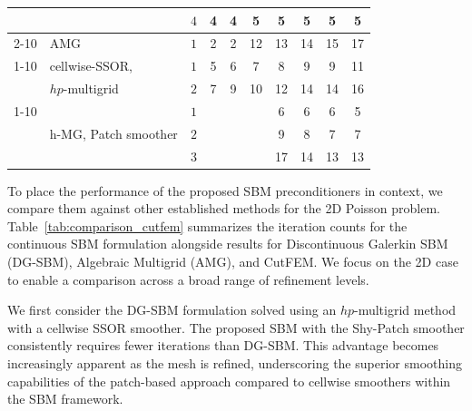 \documentclass{elsarticle}
\begin{document}
\begin{table}[h!]
\begin{tabular}{lll|ccccccc}
                                                &                                                              & $4$    & 4                                   & 4 & 5  & 5  & 5  & 5  & 5  \\
        \cline{2-10}
                                                & \multirow{1}{*}{AMG}                                         & $1$    & 2                                   & 2 & 12 & 13 & 14 & 15 & 17 \\
        \cline{1-10}
        \multirow{2}{*}{DG-SBM, $\lambda=0.25$} & {cellwise-SSOR,}                                             & $1$    & 5                                   & 6 & 7  & 8  & 9  & 9  & 11 \\
                                                & $hp$-multigrid                                               & $2$    & 7                                   & 9 & 10 & 12 & 14 & 14 & 16 \\
        \cline{1-10}
        \multirow{3}{*}{cutFEM}                 & \multirow{3}{*}{h-MG, Patch smoother\cite{cui2025multigrid}}

                                                & $1$                                                          &        &                                     &   & 6  & 6  & 6  & 5       \\
                                                &                                                              & $2$    &                                     &   &    & 9  & 8  & 7  & 7  \\
                                                &                                                              & $3$    &                                     &   &    & 17 & 14 & 13 & 13 \\
        \hline
    \end{tabular}
\end{table}

To place the performance of the proposed SBM preconditioners in context, we compare them against other established
methods for the 2D Poisson problem. Table~\ref{tab:comparison_cutfem} summarizes the iteration counts for the
continuous SBM formulation alongside results for Discontinuous Galerkin SBM (DG-SBM), Algebraic Multigrid (AMG), and
CutFEM. We focus on the 2D case to enable a comparison across a broad range of refinement levels.

We first consider the DG-SBM formulation solved using an $hp$-multigrid method with a cellwise SSOR smoother. The
proposed SBM with the Shy-Patch smoother consistently requires fewer iterations than DG-SBM. This advantage becomes
increasingly apparent as the mesh is refined, underscoring the superior smoothing capabilities of the patch-based
approach compared to cellwise smoothers within the SBM framework.
\end{document}
